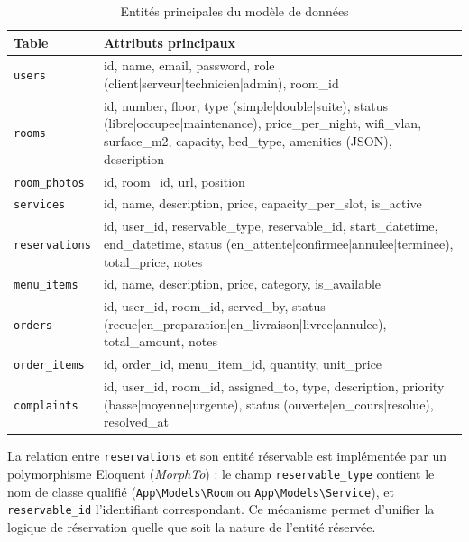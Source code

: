 \documentclass[12pt,a4paper]{report}
\begin{document}
\begin{table}[h]
    \centering
    \caption{Entités principales du modèle de données}
    \label{tab:tables}
    \begin{tabular}{|l|p{9.5cm}|}
        \hline
        \textbf{Table} & \textbf{Attributs principaux} \\
        \hline
        \texttt{users} & id, name, email, password, role (client|serveur|technicien|admin), room\_id \\
        \hline
        \texttt{rooms} & id, number, floor, type (simple|double|suite), status (libre|occupee|maintenance), price\_per\_night, wifi\_vlan, surface\_m2, capacity, bed\_type, amenities (JSON), description \\
        \hline
        \texttt{room\_photos} & id, room\_id, url, position \\
        \hline
        \texttt{services} & id, name, description, price, capacity\_per\_slot, is\_active \\
        \hline
        \texttt{reservations} & id, user\_id, reservable\_type, reservable\_id, start\_datetime, end\_datetime, status (en\_attente|confirmee|annulee|terminee), total\_price, notes \\
        \hline
        \texttt{menu\_items} & id, name, description, price, category, is\_available \\
        \hline
        \texttt{orders} & id, user\_id, room\_id, served\_by, status (recue|en\_preparation|en\_livraison|livree|annulee), total\_amount, notes \\
        \hline
        \texttt{order\_items} & id, order\_id, menu\_item\_id, quantity, unit\_price \\
        \hline
        \texttt{complaints} & id, user\_id, room\_id, assigned\_to, type, description, priority (basse|moyenne|urgente), status (ouverte|en\_cours|resolue), resolved\_at \\
        \hline
    \end{tabular}
\end{table}

La relation entre \texttt{reservations} et son entité réservable est
implémentée par un polymorphisme Eloquent (\textit{MorphTo}) : le champ
\texttt{reservable\_type} contient le nom de classe qualifié (\texttt{App\textbackslash{}Models\textbackslash{}Room}
ou \texttt{App\textbackslash{}Models\textbackslash{}Service}), et
\texttt{reservable\_id} l'identifiant correspondant. Ce mécanisme permet
d'unifier la logique de réservation quelle que soit la nature de l'entité
réservée.
\end{document}
